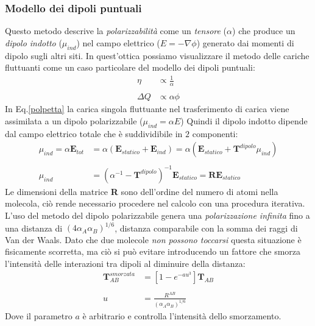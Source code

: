 \documentclass[oneside]{amsbook}
\numberwithin{section}{chapter}
\numberwithin{equation}{section}
\numberwithin{figure}{section}
\begin{document}
\subsubsection{Modello dei dipoli puntuali}
Questo metodo descrive la \emph{polarizzabilità} come un \emph{tensore} ($\alpha$) che produce un \emph{dipolo indotto} ($\mu _{ind}$) nel campo elettrico ($E=-\nabla \phi$) generato dai momenti di dipolo sugli altri siti. In quest'ottica possiamo visualizzare il metodo delle cariche fluttuanti come un caso particolare del modello dei dipoli puntuali:
\begin{equation}
\label{polpetta}
\begin{aligned}
\eta &\propto \frac{1}{\alpha} \\ \\
\Delta Q &\propto \alpha \phi
\end{aligned}
\end{equation}
In Eq.\ref{polpetta} la carica singola fluttuante nel trasferimento di carica viene assimilata a un dipolo polarizzabile ($\mu_{ind}= \alpha E$)
Quindi il dipolo indotto dipende dal campo elettrico totale che è suddividibile in $2$ componenti:
\begin{equation}
\label{recarlo}
\begin{aligned}
\mu_{ind}=\alpha \textbf{E}_{tot} &= \alpha (\textbf{E}_{statico}+\textbf{E}_{ind})= \alpha (\textbf{E}_{statico} + \textbf{T}^{dipolo} \mu_{ind}) \\ \\
\mu_{ind}&=(\alpha^{-1}-\textbf{T}^{dipolo})^{-1}\textbf{E}_{statico}= \textbf{R} \textbf{E}_{statico}
\end{aligned}
\end{equation}
Le dimensioni della matrice \textbf{R} sono dell'ordine del numero di atomi nella molecola, ciò rende necessario procedere nel calcolo con una procedura iterativa. 
L'uso del metodo del dipolo polarizzabile genera una \emph{polarizzazione
 infinita} fino a una distanza di $(4 \alpha _A \alpha _B)^{1/6}$, distanza comparabile con la somma dei raggi di Van der Waals. Dato che due molecole \emph{non possono toccarsi} questa situazione è fisicamente scorretta, ma ciò si può evitare introducendo un fattore che smorza l'intensità delle interazioni tra dipoli al diminuire della distanza:
 \begin{equation}
 \begin{aligned}
 \textbf{T}^{smorzata} _{AB} &= [1-e^{-au^3}]\textbf{T}_{AB} \\ \\
 u &= \frac{R^{AB}}{(\alpha _A \alpha _B)^{1/6}}
 \end{aligned}
 \end{equation}
Dove il parametro $a$ è arbitrario e controlla l'intensità dello smorzamento.
\end{document}
